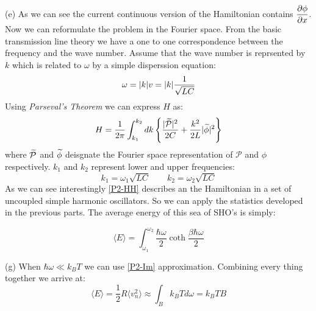 \begin{homeworkProblem}
\begin{homeworkSection}{(e)}
As we can see the current continuous version of the Hamiltonian contains $\dfrac{\partial \phi}{\partial x}$. Now we can reformulate the problem in the Fourier space. From the basic transmission line theory  we have a one to one correspondence between the frequency and  the wave number. Assume that the wave number is reprsented by $k$ which is related to $\omega$ by a simple disperssion equation:
\begin{equation}
\omega=\lvert k\rvert v=\lvert k\rvert\frac{1}{\sqrt{LC}}
\end{equation}   
Using \textit{Parseval's Theorem}  we can express $H$ as:
\begin{equation}\label{P2-HH}
H=\frac{1}{2\pi}\int_{k_1}^{k_2} dk\left\{\frac{\lvert\widetilde{\mathcal{P}}\rvert^2}{2C}+\frac{k^2}{2L}\lvert\widetilde{\phi}\rvert^2\right\}
\end{equation}
where $\widetilde{\mathcal{P}}$ and $\widetilde{\phi}$  deisgnate  the Fourier space representation of $\mathcal{P}$ and $\phi$ respectively. $k_1$ and $k_2$ represent lower and upper frequencies:
\begin{equation}
k_1=\omega_1\sqrt{LC}\qquad k_2=\omega_2\sqrt{LC}
\end{equation} 
As we can see interestingly \eqref{P2-HH} describes an the Hamiltonian in a set of uncoupled simple harmonic oscillators. So we can apply the statistics  developed in the previous parts. The average energy of this sea of SHO's is simply:

\begin{equation}
\langle E\rangle=\int_{\omega_1}^{\omega_2}\frac{\hbar\omega}{2}\coth\frac{\beta\hbar\omega}{2}
\end{equation}
\end{homeworkSection}
\begin{homeworkSection}{(g)}
When $\hbar\omega\ll k_BT$ we can use \eqref{P2-Im} approximation. Combining every thing together we arrive at:
\begin{equation}
\langle E\rangle=\frac{1}{2}R\langle v_n^2\rangle \approx\int_{B} k_BTd\omega=k_B T B
\end{equation}
\end{homeworkSection}




\end{homeworkProblem}